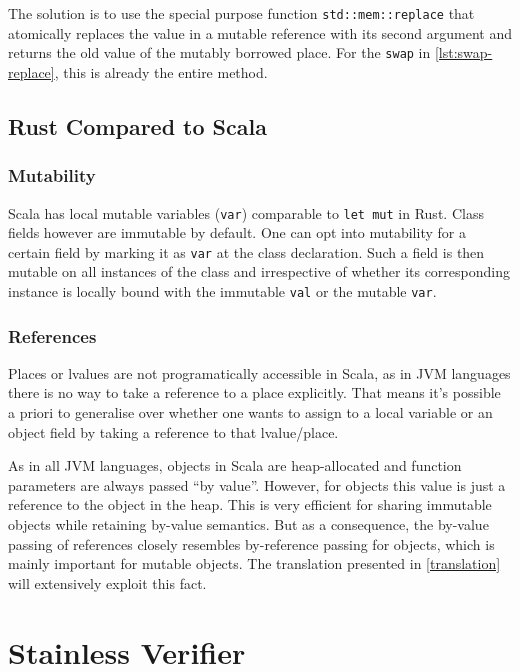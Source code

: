 The solution is to use the special purpose function
\lstinline!std::mem::replace! that atomically replaces the value in a mutable
reference with its second argument and returns the old value of the mutably
borrowed place. For the \lstinline!swap! in \autoref{lst:swap-replace}, this is
already the entire method.


\subsection{Rust Compared to Scala}

\subsubsection{Mutability}

Scala has local mutable variables (\lstinline!var!) comparable to
\passthrough{\lstinline!let mut!} in Rust. Class fields however are immutable by
default. One can opt into mutability for a certain field by marking it as
\lstinline!var! at the class declaration. Such a field is then mutable on all
instances of the class and irrespective of whether its corresponding instance is
locally bound with the immutable \lstinline!val! or the mutable \lstinline!var!.

\subsubsection{References}

Places or lvalues are not programatically accessible in Scala, as in JVM
languages there is no way to take a reference to a place explicitly. That means
it's possible a priori to generalise over whether one wants to assign to a local
variable or an object field by taking a reference to that lvalue/place.

As in all JVM languages, objects in Scala are heap-allocated and function
parameters are always passed ``by value''. However, for objects this value is
just a reference to the object in the heap. This is very efficient for sharing
immutable objects while retaining by-value semantics. But as a consequence, the
by-value passing of references closely resembles by-reference passing for
objects, which is mainly important for mutable objects. The translation
presented in \autoref{translation} will extensively exploit this fact.





\section{Stainless Verifier}

